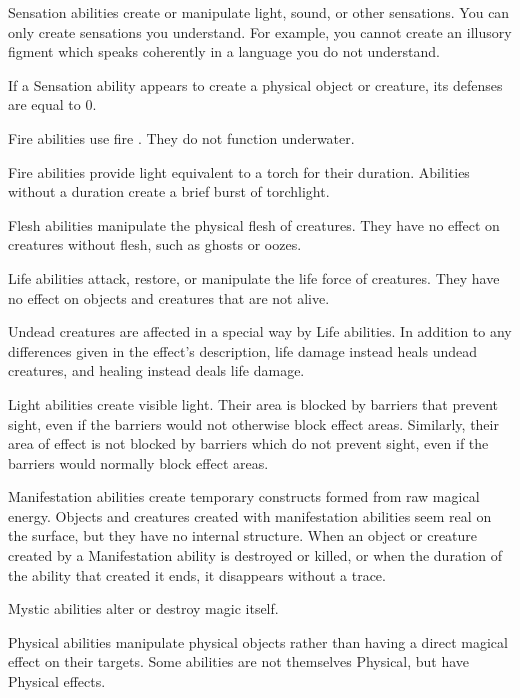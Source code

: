          Sensation abilities create or manipulate light, sound, or other sensations.
        You can only create sensations you understand.
        For example, you cannot create an illusory figment which speaks coherently in a language you do not understand.
        \par If a Sensation ability appears to create a physical object or creature, its defenses are equal to 0.

         Fire abilities use fire . They do not function underwater.
        \par Fire abilities provide light equivalent to a torch for their duration.
        Abilities without a duration create a brief burst of torchlight.

         Flesh abilities manipulate the physical flesh of creatures.
        They have no effect on creatures without flesh, such as ghosts or oozes.

         Life abilities attack, restore, or manipulate the life force of creatures.
        They have no effect on objects and creatures that are not alive.
        \par Undead creatures are affected in a special way by Life abilities.
        In addition to any differences given in the effect's description, life damage instead heals undead creatures, and healing instead deals life damage.

         Light abilities create visible light.
        Their area is blocked by barriers that prevent sight, even if the barriers would not otherwise block effect areas.
        Similarly, their area of effect is not blocked by barriers which do not prevent sight, even if the barriers would normally block effect areas.

         Manifestation abilities create temporary constructs formed from raw magical energy.
        Objects and creatures created with manifestation abilities seem real on the surface, but they have no internal structure.
        When an object or creature created by a Manifestation ability is destroyed or killed, or when the duration of the ability that created it ends, it disappears without a trace.

         Mystic abilities alter or destroy magic itself.

         Physical abilities manipulate physical objects rather than having a direct magical effect on their targets.
        Some abilities are not themselves Physical, but have Physical effects.

